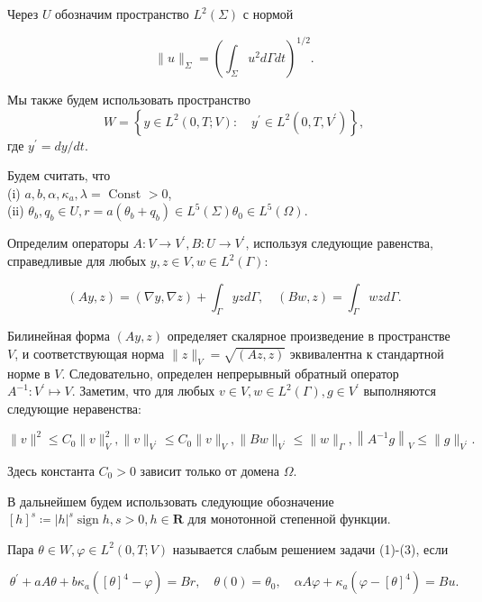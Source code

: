 Через $U$ обозначим пространство $L^{2}(\Sigma)$ с нормой

\[ \|u\|_{\Sigma}=\left(\int_{\Sigma} u^{2} d \Gamma d t\right)^{1 / 2}. \]


Мы также будем использовать пространство
\[
    W=\left\{y \in L^{2}(0, T ; V): \quad y^{\prime}
    \in L^{2}\left(0, T, V^{\prime}\right)\right\},
\]
где $y^{\prime}=d y / d t$.

Будем считать, что \\
(i) $a, b, \alpha, \kappa_{a}, \lambda=$ Const $>0$, \\
(ii) $\theta_{b}, q_{b} \in U, r=a\left(\theta_{b}+q_{b}\right) \in L^{5}(\Sigma) \theta_{0} \in L^{5}(\Omega)$.


Определим операторы $A: V \rightarrow V^{\prime}, B: U \rightarrow V^{\prime}$,
используя следующие равенства, справедливые для любых $y, z \in V, w \in L^{2}(\Gamma)$:

\[
    (A y, z)=(\nabla y, \nabla z)+\int_{\Gamma} y z d \Gamma, \quad(B w, z)=\int_{\Gamma} w z d \Gamma.
\]

Билинейная форма $(A y, z)$ определяет скалярное произведение в пространстве $V$,
и соответствующая норма $\|z\|_{V}=\sqrt{(A z, z)}$ эквивалентна к стандартной норме в $V$.
Следовательно, определен непрерывный обратный оператор $A^{-1}: V^{\prime} \mapsto V$.
Заметим, что для любых $v \in V, w \in L^{2}(\Gamma), g \in V^{\prime}$
выполняются следующие неравенства:

\[
    \|v\|^{2} \leq C_{0}\|v\|_{V}^{2},\|v\|_{V^{\prime}} \leq C_{0}\|v\|_{V},\|B w\|_{V^{\prime}}
    \leq\|w\|_{\Gamma},\left\|A^{-1} g\right\|_{V} \leq\|g\|_{V^{\prime}}.
\]

Здесь константа $C_{0}>0$ зависит только от домена $\Omega$.

В дальнейшем будем использовать следующие обозначение
$[h]^{s} \coloneqq |h|^{s} \operatorname{sign} h, s>0, h \in \mathbf{R}$
для монотонной степенной функции.


\begin{definition}
    Пара $\theta \in W, \varphi \in L^{2}(0, T ; V)$ называется слабым решением задачи (1)-(3), если

    \begin{equation}
        \label{eq:2_3:6}
        \theta^{\prime}+a A \theta+b \kappa_{a}\left([\theta]^{4}-\varphi\right)=B r,
        \quad \theta(0)=\theta_{0}, \quad \alpha A \varphi
        + \kappa_{a}\left(\varphi-[\theta]^{4}\right)=B u.
    \end{equation}
\end{definition}

